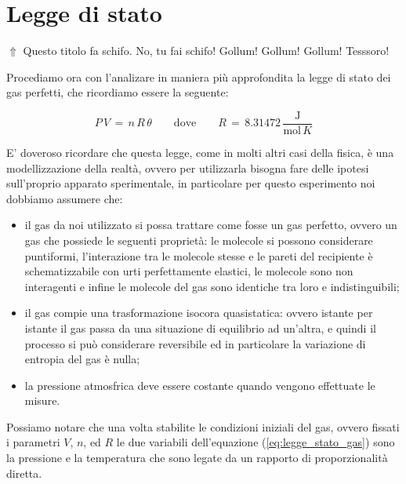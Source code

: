 \section{Legge di stato}

$\Uparrow$ Questo titolo fa schifo. No, tu fai schifo! Gollum! Gollum! Gollum! Tesssoro!
\bigskip

Procediamo ora con l'analizare in maniera più approfondita la legge di stato dei gas perfetti, che ricordiamo essere la seguente:

\begin{equation*}
	P \, V \,=\, n \, R \, \theta \quad\quad \text{dove} \quad\quad R \,=\, 8.31472 \, \frac{\text{J}}{\text{mol} \, K}
\end{equation*}

E' doveroso ricordare che questa legge, come in molti altri casi della fisica, è una modellizzazione della realtà, ovvero per utilizzarla bisogna fare delle ipotesi sull'proprio apparato sperimentale, in particolare per questo esperimento noi dobbiamo assumere che:

\begin{itemize}
	\item{il gas da noi utilizzato si possa trattare come fosse un gas perfetto, ovvero un gas che possiede le seguenti proprietà: le molecole si possono considerare puntiformi, l'interazione tra le molecole stesse e le pareti del recipiente è schematizzabile con urti perfettamente elastici, le molecole sono non interagenti e infine le molecole del gas sono identiche tra loro e indistinguibili;}
	\item{il gas compie una trasformazione isocora quasistatica: ovvero istante per istante il gas passa da una situazione di equilibrio ad un'altra, e quindi il processo si può considerare reversibile ed in particolare la variazione di entropia del gas è nulla;}
	\item{la pressione atmosfrica deve essere costante quando vengono effettuate le misure.}
\end{itemize}
%
Possiamo notare che una volta stabilite le condizioni iniziali del gas, ovvero fissati i parametri $V$, $n$, ed $R$ le due variabili dell'equazione (\ref{eq:legge_stato_gas}) sono la pressione e la temperatura che sono legate da un rapporto di proporzionalità diretta. 
